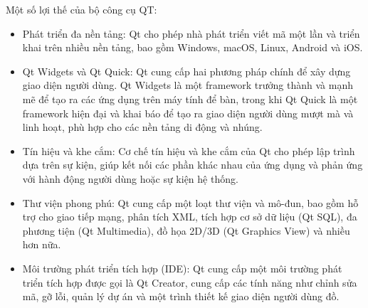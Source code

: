 Một số lợi thế của bộ công cụ QT:
\begin{itemize}
	\item Phát triển đa nền tảng: Qt cho phép nhà phát triển viết mã một lần và triển khai trên nhiều nền tảng, bao gồm Windows, macOS, Linux, Android và iOS.
	
	\item Qt Widgets và Qt Quick: Qt cung cấp hai phương pháp chính để xây dựng giao diện người dùng. Qt Widgets là một framework trưởng thành và mạnh mẽ để tạo ra các ứng dụng trên máy tính để bàn, trong khi Qt Quick là một framework hiện đại và khai báo để tạo ra giao diện người dùng mượt mà và linh hoạt, phù hợp cho các nền tảng di động và nhúng.
	
	\item Tín hiệu và khe cắm: Cơ chế tín hiệu và khe cắm của Qt cho phép lập trình dựa trên sự kiện, giúp kết nối các phần khác nhau của ứng dụng và phản ứng với hành động người dùng hoặc sự kiện hệ thống.
	
	\item Thư viện phong phú: Qt cung cấp một loạt thư viện và mô-đun, bao gồm hỗ trợ cho giao tiếp mạng, phân tích XML, tích hợp cơ sở dữ liệu (Qt SQL), đa phương tiện (Qt Multimedia), đồ họa 2D/3D (Qt Graphics View) và nhiều hơn nữa.
	
	\item Môi trường phát triển tích hợp (IDE): Qt cung cấp một môi trường phát triển tích hợp được gọi là Qt Creator, cung cấp các tính năng như chỉnh sửa mã, gỡ lỗi, quản lý dự án và một trình thiết kế giao diện người dùng đồ.
\end{itemize}